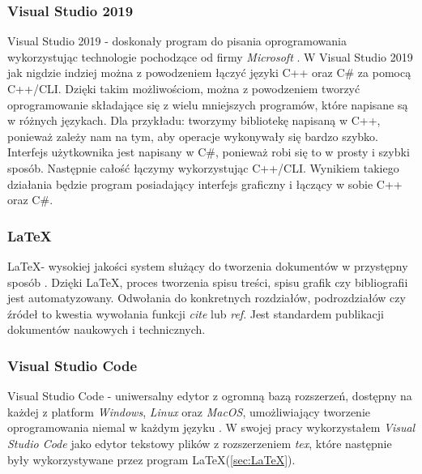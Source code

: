 \documentclass{article}
\begin{document}
        \subsubsection{Visual Studio 2019}
        {
            \label{sec:VisualStudio2019}
            \Large
            \justifying
            \quad
            Visual Studio 2019 - doskonały program do pisania oprogramowania wykorzystując technologie pochodzące od firmy \emph{Microsoft} \cite{VS2019}.
            W Visual Studio 2019 jak nigdzie indziej można z powodzeniem łączyć języki C++ oraz C\# za pomocą C++/CLI.
            Dzięki takim możliwościom, można z powodzeniem tworzyć oprogramowanie składające się z wielu mniejszych programów, które napisane są w różnych językach.
            Dla przykładu: tworzymy bibliotekę napisaną w C++, ponieważ zależy nam na tym, aby operacje wykonywały się bardzo szybko.
            Interfejs użytkownika jest napisany w C\#, ponieważ robi się to w prosty i szybki sposób.
            Następnie całość łączymy wykorzystując C++/CLI.
            Wynikiem takiego działania będzie program posiadający interfejs graficzny i łączący w sobie C++ oraz C\#.
        }
        \subsubsection{\LaTeX}
        {
            \label{sec:LaTeX}
            \Large
            \justifying
            \LaTeX - wysokiej jakości system służący do tworzenia dokumentów w przystępny sposób \cite{LaTeX}.
            Dzięki \LaTeX, proces tworzenia spisu treści, spisu grafik czy bibliografii jest automatyzowany.
            Odwołania do konkretnych rozdziałów, podrozdziałów czy źródeł to kwestia wywołania funkcji \emph{cite} lub \emph{ref}.
            Jest standardem publikacji dokumentów naukowych i technicznych.
        }
        \subsubsection{Visual Studio Code}
        {
            \label{sec:VisualStudioCode}
            \Large
            \justifying
            \quad
            Visual Studio Code - uniwersalny edytor z ogromną bazą rozszerzeń, dostępny na każdej z platform \emph{Windows}, \emph{Linux} oraz \emph{MacOS}, umożliwiający tworzenie oprogramowania niemal w każdym języku \cite{VSCode}.
            W swojej pracy wykorzystałem \emph{Visual Studio Code} jako edytor tekstowy plików z rozszerzeniem \emph{tex}, które następnie były wykorzystywane przez program \LaTeX (\ref{sec:LaTeX}).
        }
\end{document}
